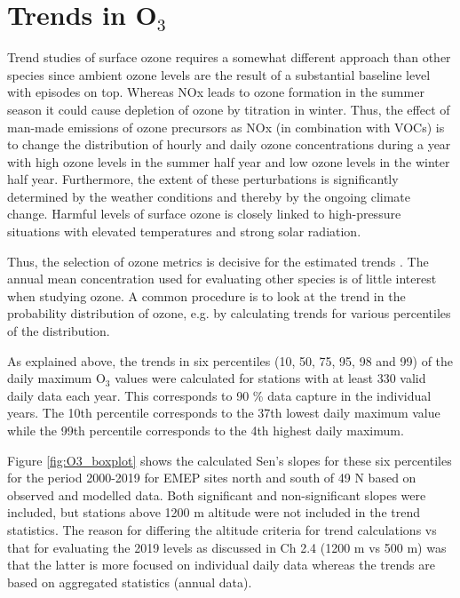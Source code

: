 \clearpage
\section{\label{sec:Trends_O3}Trends in O$_3$ }

Trend studies of surface ozone requires a somewhat different approach than other species since ambient ozone levels are the result of a substantial baseline level with episodes on top. Whereas NOx leads to ozone formation in the summer season it could cause depletion of ozone by titration in winter. Thus, the effect of man-made emissions of ozone precursors as NOx (in combination with VOCs) is to change the distribution of hourly and daily ozone concentrations during a year with high ozone levels in the summer half year and low ozone levels in the winter half year. Furthermore, the extent of these perturbations is significantly determined by the weather conditions and thereby by the ongoing climate change. Harmful levels of surface ozone is closely linked to high-pressure situations with elevated temperatures and strong solar radiation.

Thus, the selection of ozone metrics is decisive for the estimated trends \citep[e.g.][]{LefohnTOAR2018}. The annual mean concentration used for evaluating other species is of little interest when studying ozone. A common procedure is to look at the trend in the probability distribution of ozone, e.g. by calculating trends for various percentiles of the distribution.  

As explained above, the trends in six percentiles (10, 50, 75, 95, 98 and 99) of the daily maximum O$_3$ values were calculated for stations with at least 330 valid daily data each year. This corresponds to 90 \% data capture in the individual years. The 10th percentile corresponds to the 37th lowest daily maximum value while the 99th percentile corresponds to the 4th highest daily maximum. 

Figure \ref{fig:O3_boxplot} shows the calculated Sen's slopes for these six percentiles for the period 2000-2019 for EMEP sites north and south of 49 \degrees N based on observed and modelled data. Both significant and non-significant slopes were included, but stations above 1200 m altitude were not included in the trend statistics. The reason for differing the altitude criteria for trend calculations vs that for evaluating the 2019 levels as discussed in Ch 2.4 (1200 m vs 500 m) was that the latter is more focused on individual daily data whereas the trends are based on aggregated statistics (annual data). 

